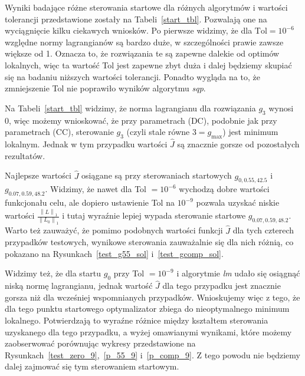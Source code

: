 \documentclass[licencjacka]{pracamgr}
\newcommand{\norm}[1]{\left\lVert#1\right\rVert}
\begin{document}
Wyniki badające różne sterowania startowe dla różnych algorytmów i wartości tolerancji przedstawione zostały na Tabeli~\ref{start_tbl}. Pozwalają one na wyciągnięcie kilku ciekawych wniosków. Po pierwsze widzimy, że dla $\text{Tol} = 10^{-6}$ względne normy lagrangianów są bardzo duże, w szczególności prawie zawsze większe od 1. Oznacza to, że rozwiązania te są zapewne dalekie od optimów lokalnych, więc ta wartość Tol jest zapewne zbyt duża i dalej będziemy skupiać się na badaniu niższych wartości tolerancji. Ponadto wygląda na to, że zmniejszenie Tol nie poprawiło wyników algorytmu {\it sqp}.

Na Tabeli~\ref{start_tbl} widzimy, że norma lagrangianu dla rozwiązania $g_3$ wynosi 0, więc możemy wnioskować, że przy parametrach (DC), podobnie jak przy parametrach (CC), sterowanie $g_3$ (czyli stale równe $3 = g_{\max}$) jest minimum lokalnym. Jednak w tym przypadku wartości $\hat{J}$ są znacznie gorsze od pozostałych rezultatów. 

Najlepsze wartości $\hat{J}$ osiągane są przy sterowaniach startowych $g_{0,0.55,42.5}$ i $g_{0.07,0.59,48.2}$. Widzimy, że nawet dla Tol $= 10^{-6}$ wychodzą dobre wartości funkcjonału celu, ale dopiero ustawienie Tol na $10^{-9}$ pozwala uzyskać niskie wartości $\frac{\norm{L}_1}{\norm{L_0}_1}$ i tutaj wyraźnie lepiej wypada sterowanie startowe $g_{0.07,0.59,48.2}$. Warto też zauważyć, że pomimo podobnych wartości funkcji $\hat{J}$ dla tych czterech przypadków testowych, wynikowe sterowania zauważalnie się dla nich różnią, co pokazano na Rysunkach~\ref{test_g55_sol} i~\ref{test_gcomp_sol}.

Widzimy też, że dla startu $g_0$ przy Tol $= 10^{-9}$ i algorytmie {\it lm\/} udało się osiągnąć niską normę lagrangianu, jednak wartość $\hat{J}$ dla tego przypadku jest znacznie gorsza niż dla wcześniej wspomnianych przypadków. Wnioskujemy więc z tego, że dla tego punktu startowego optymalizator zbiega do nieoptymalnego minimum lokalnego. Potwierdzają to wyraźne różnice między kształtem sterowania uzyskanego dla tego przypadku, a wyżej omawianymi wynikami, które możemy zaobserwować porównując wykresy przedstawione na Rysunkach~\ref{test_zero_9},~\ref{p_55_9} i~\ref{p_comp_9}. Z tego powodu nie będziemy dalej zajmować się tym sterowaniem startowym.
\end{document}
